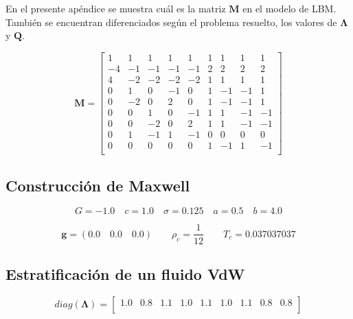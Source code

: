 \chapter{}
\label{ap}

En el presente apéndice se muestra cuál es la matriz $\mathbf{M}$ en el modelo de LBM. También se encuentran diferenciados según el problema resuelto, los valores de $\mathbf{\Lambda}$ y $\mathbf{Q}$.

\begin{equation}
\mathbf{M} =
\begin{bmatrix}
	1 & 1 & 1 & 1 & 1 & 1 & 1 & 1 & 1 \\
   -4 &-1 &-1 &-1 &-1 & 2 & 2 & 2 & 2 \\
    4 &-2 &-2 &-2 &-2 & 1 & 1 & 1 & 1 \\
    0 & 1 & 0 &-1 & 0 & 1 &-1 &-1 & 1 \\
    0 &-2 & 0 & 2 & 0 & 1 &-1 &-1 & 1 \\
    0 & 0 & 1 & 0 &-1 & 1 & 1 &-1 &-1 \\
    0 & 0 &-2 & 0 & 2 & 1 & 1 &-1 &-1 \\
    0 & 1 &-1 & 1 &-1 & 0 & 0 & 0 & 0 \\    
    0 & 0 & 0 & 0 & 0 & 1 &-1 & 1 &-1 \\        
\end{bmatrix}
\end{equation}

\section{Construcción de Maxwell}
\label{parametros_MxC}

\begin{equation}
G = -1.0 \quad c = 1.0 \quad \sigma = 0.125 \quad a = 0.5 \quad b = 4.0 
\end{equation}

\begin{equation}
\mathbf{g} = (0.0 \quad 0.0 \quad 0.0 ) \qquad \rho_c = \frac{1}{12} \qquad T_c = 0.037037037
\end{equation}

\section{Estratificación de un fluido VdW}
\label{parametros_VdW}

\begin{equation}
	diag(\mathbf{\Lambda}) = 
	\begin{bmatrix}
		1.0 & 0.8 & 1.1 & 1.0 & 1.1 & 1.0 & 1.1 & 0.8 & 0.8 \\
	\end{bmatrix}
\end{equation}

